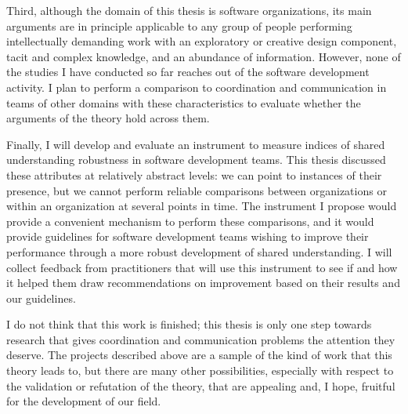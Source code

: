 Third, although the domain of this thesis is software organizations, its main arguments are in principle applicable to any group of people performing intellectually demanding work with an exploratory or creative design component, tacit and complex knowledge, and an abundance of information. However, none of the studies I have conducted so far reaches out of the software development activity. I plan to perform a comparison to coordination and communication in teams of other domains with these characteristics to evaluate whether the arguments of the theory hold across them.

Finally, I will develop and evaluate an instrument to measure indices of shared understanding robustness in software development teams. This thesis discussed these attributes at relatively abstract levels: we can point to instances of their presence, but we cannot perform reliable comparisons between organizations or within an organization at several points in time. The instrument I propose would provide a convenient mechanism to perform these comparisons, and it would provide guidelines for software development teams wishing to improve their performance through a more robust development of shared understanding. I will collect feedback from practitioners that will use this instrument to see if and how it helped them draw recommendations on improvement based on their results and our guidelines.

I do not think that this work is finished; this thesis is only one step towards research that gives coordination and communication problems the attention they deserve. The projects described above are a sample of the kind of work that this theory leads to, but there are many other possibilities, especially with respect to the validation or refutation of the theory, that are appealing and, I hope, fruitful for the development of our field.

